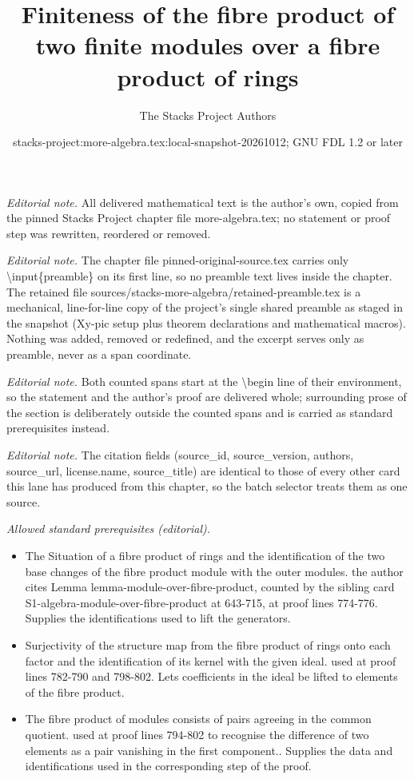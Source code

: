 \documentclass[10pt,a4paper]{amsart}
\title{Finiteness of the fibre product of two finite modules over a fibre product of rings}
\author{The Stacks Project Authors}
\date{stacks-project:more-algebra.tex:local-snapshot-20261012; GNU FDL 1.2 or later}
\theoremstyle{plain}
\theoremstyle{definition}
\theoremstyle{remark}
\numberwithin{equation}{subsection}
\begin{document}
\maketitle
\setcounter{subsection}{1}
\noindent\textit{Editorial note.} All delivered mathematical text is the author's own, copied from the pinned Stacks Project chapter file more-algebra.tex; no statement or proof step was rewritten, reordered or removed.\par\medskip
\noindent\textit{Editorial note.} The chapter file pinned-original-source.tex carries only \textbackslash{}input\{preamble\} on its first line, so no preamble text lives inside the chapter. The retained file sources/stacks-more-algebra/retained-preamble.tex is a mechanical, line-for-line copy of the project's single shared preamble as staged in the snapshot (Xy-pic setup plus theorem declarations and mathematical macros). Nothing was added, removed or redefined, and the excerpt serves only as preamble, never as a span coordinate.\par\medskip
\noindent\textit{Editorial note.} Both counted spans start at the \textbackslash{}begin line of their environment, so the statement and the author's proof are delivered whole; surrounding prose of the section is deliberately outside the counted spans and is carried as standard prerequisites instead.\par\medskip
\noindent\textit{Editorial note.} The citation fields (source\_id, source\_version, authors, source\_url, license.name, source\_title) are identical to those of every other card this lane has produced from this chapter, so the batch selector treats them as one source.\par\medskip
\noindent\textit{Allowed standard prerequisites (editorial).}\begin{itemize}
\item The Situation of a fibre product of rings and the identification of the two base changes of the fibre product module with the outer modules. the author cites Lemma lemma-module-over-fibre-product, counted by the sibling card S1-algebra-module-over-fibre-product at 643-715, at proof lines 774-776. Supplies the identifications used to lift the generators.
\item Surjectivity of the structure map from the fibre product of rings onto each factor and the identification of its kernel with the given ideal. used at proof lines 782-790 and 798-802. Lets coefficients in the ideal be lifted to elements of the fibre product.
\item The fibre product of modules consists of pairs agreeing in the common quotient. used at proof lines 794-802 to recognise the difference of two elements as a pair vanishing in the first component.. Supplies the data and identifications used in the corresponding step of the proof.
\end{itemize}\medskip
\end{document}
